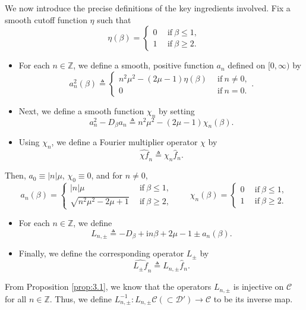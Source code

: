 \documentclass[11pt]{article}
\theoremstyle{definition}
\theoremstyle{remark}
\numberwithin{equation}{section}
\newcommand{\mbb}{\mathbb}
\newcommand{\mcal}{\mathcal}
\renewcommand{\hat}{\widehat}
\newcommand{\Z}{\mbb{Z}}
\begin{document}
We now introduce the precise definitions of the key ingredients involved. Fix a smooth cutoff function $\eta$ such that
\[\eta(\beta) = \begin{cases} 0 & ~~\text{if}~ \beta \leq 1, \\ 1 & ~~\text{if}~ \beta \geq 2.  \end{cases}\]
\begin{itemize}
	\item For each $n\in \Z$, we define a smooth, positive function $a_n$ defined on $[0,\infty)$ by
\begin{equation} \label{eq:3.3}
a_n^2(\beta) \triangleq \begin{cases} n^2 \mu^2 - (2\mu - 1) \eta(\beta) & ~~\text{if}~ n \neq 0, \\ 0 & ~~ \text{if}~ n = 0. \end{cases}.
\end{equation}
	\item Next, we define a smooth function $\chi_n$ by setting
\begin{equation} \label{eq:3.4}
a_n^2 - D_\beta a_n \triangleq n^2 \mu^2 - (2\mu - 1) \chi_n(\beta).
\end{equation}
	\item Using $\chi_n$, we define a Fourier multiplier operator $\chi$ by
\[\hat{\chi f}_n \triangleq \chi_n \hat{f}_n.\]
\end{itemize}
Then, $a_0 \equiv |n|\mu$, $\chi_0 \equiv 0$, and for $n\neq 0$,
\[a_n(\beta) = \begin{cases} |n|\mu & ~~\text{if}~ \beta \leq 1, \\ \sqrt{n^2 \mu^2 - 2\mu + 1} & ~~\text{if}~ \beta \geq 2,  \end{cases}\qquad \chi_n(\beta) = \begin{cases} 0 & ~~\text{if}~ \beta \leq 1, \\ 1 & ~~\text{if}~ \beta \geq 2.  \end{cases}\]
\begin{itemize}
	\item For each $n\in \Z$, we define
\[L_{n,\pm} \triangleq -D_\beta + \textrm{i}n \beta + 2\mu - 1 \pm a_n (\beta).\]
	\item Finally, we define the corresponding operator $L_\pm$ by
\[\hat{L_{\pm} f}_n \triangleq L_{n,\pm} \hat{f}_n.\]
\end{itemize}

From Proposition \ref{prop:3.1}, we know that the operators $L_{n,\pm}$ is injective on $\mcal{C}$ for all $n\in \Z$. Thus, we define $L_{n,\pm}^{-1} : L_{n,\pm} \mcal{C} (\subset \mcal{D}') \to \mcal{C}$ to be its inverse map.
\end{document}
